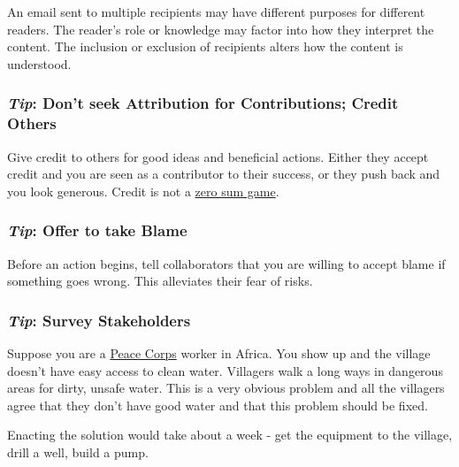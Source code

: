 
An email sent to multiple recipients may have different purposes for different readers. The reader's role or knowledge may factor into how they interpret the content. The inclusion or exclusion of recipients alters how the content is understood. 



\subsubsection*{\textit{Tip}: Don't seek Attribution for Contributions; Credit Others\label{sec:credit-others}}

Give credit to others for good ideas and beneficial actions. Either they accept credit and you are seen as a contributor to their success, or they push back and you look generous. Credit is not a \href{https://en.wikipedia.org/wiki/Zero-sum_game}{zero sum game}.

\subsubsection*{\textit{Tip}: Offer to take Blame\label{sec:take-blame}}

Before an action begins, tell collaborators that you are willing to accept blame if something goes wrong. This alleviates their fear of risks.

\subsubsection*{\textit{Tip}: Survey Stakeholders}

Suppose you are a \href{http://www.peacecorps.gov/}{Peace Corps} worker in Africa. You show up and the village doesn't have easy access to clean water. Villagers walk a long ways in dangerous areas for dirty, unsafe water. This is a very obvious problem and all the villagers agree that they don't have good water and that this problem should be fixed.

Enacting the solution would take about a week - get the equipment to the village, drill a well, build a pump.

